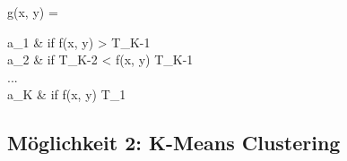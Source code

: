 		\begin{flalign}
			\centering
			g(x, y) = 
			\begin{cases}
				a_{1} & \textrm{if } f(x, y) > T_{K-1} \\
				a_{2} & \textrm{if } T_{K-2} < f(x, y) \leq T_{K-1} \\
				... \\
				a_{K} & \textrm{if } f(x, y) \leq T_{1}
			\end{cases}
			\label{eq:threshold}
		\end{flalign}
	
	\subsection{Möglichkeit 2: K-Means Clustering}
	\label{sec:meth2}